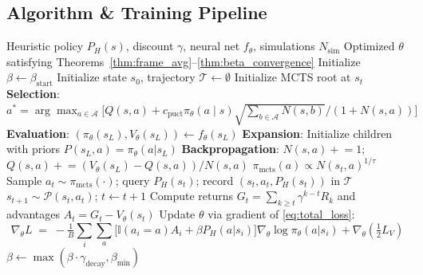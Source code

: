 \documentclass{article}
\begin{document}
\subsection{Algorithm \& Training Pipeline}
\begin{algorithm}[H]
\caption{Heuristic-Guided $D_4$-Equivariant Actor-Critic MCTS Training}
\label{alg:training_pipeline}
\begin{algorithmic}[1]
\REQUIRE Heuristic policy $P_H(s)$, discount $\gamma$, neural net $f_\theta$, simulations $N_{\mathrm{sim}}$
\ENSURE Optimized $\theta$ satisfying Theorems~\ref{thm:frame_avg}--\ref{thm:beta_convergence}
\STATE Initialize $\beta \leftarrow \beta_{\mathrm{start}}$
    \STATE Initialize state $s_0$, trajectory $\mathcal{T} \leftarrow \emptyset$
        \STATE Initialize MCTS root at $s_t$
            \STATE \textbf{Selection}: $a^* = \arg\max_{a \in \mathcal{A}}\bigl[Q(s,a) + c_{\mathrm{puct}}\pi_\theta(a \mid s)\sqrt{\textstyle\sum_{b \in \mathcal{A}} N(s,b)}/(1+N(s,a))\bigr]$
            \STATE \textbf{Evaluation}: $(\pi_\theta(s_L), V_\theta(s_L)) \leftarrow f_\theta(s_L)$ 
            \STATE \textbf{Expansion}: Initialize children with priors $P(s_L, a) = \pi_\theta(a|s_L)$
            \STATE \textbf{Backpropagation}: $N(s,a) \mathrel{+}= 1$;\; $Q(s,a) \mathrel{+}= (V_\theta(s_L)-Q(s,a))/N(s,a)$
        \ENDFOR
        \STATE $\pi_{\mathrm{mcts}}(a) \propto N(s_t, a)^{1/\tau}$ 
        \STATE Sample $a_t \sim \pi_{\mathrm{mcts}}(\cdot)$; query $P_H(s_t)$; record $(s_t, a_t, P_H(s_t))$ in $\mathcal{T}$
        \STATE $s_{t+1} \sim \mathcal{P}(s_t, a_t)$;\; $t \leftarrow t+1$
    \ENDWHILE
    \STATE Compute returns $G_t = \sum_{k \geq t} \gamma^{k-t} R_k$ and advantages $A_t = G_t - V_\theta(s_t)$
    \STATE Update $\theta$ via gradient of \eqref{eq:total_loss}: 
    \begin{equation*}
        \nabla_\theta L \;=\; -\tfrac{1}{B}\sum_i \sum_a \bigl[\mathbb{I}(a_i{=}a)A_i + \beta P_H(a|s_i)\bigr]\nabla_\theta\log\pi_\theta(a|s_i) + \nabla_\theta(\tfrac{1}{2}L_V)
    \end{equation*}
    \STATE $\beta \leftarrow \max(\beta \cdot \gamma_{\mathrm{decay}}, \beta_{\min})$ 
\ENDFOR
\end{algorithmic}
\end{algorithm}
\end{document}
